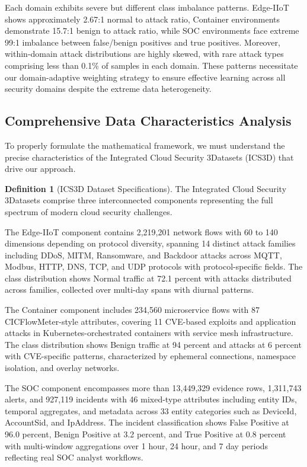 \documentclass[12pt,a4paper]{article}
\theoremstyle{definition}
\newtheorem{definition}[theorem]{Definition}
\begin{document}
Each domain exhibits severe but different class imbalance patterns. Edge-IIoT shows approximately 2.67:1 normal to attack ratio, Container environments demonstrate 15.7:1 benign to attack ratio, while SOC environments face extreme 99:1 imbalance between false/benign positives and true positives. Moreover, within-domain attack distributions are highly skewed, with rare attack types comprising less than 0.1\% of samples in each domain. These patterns necessitate our domain-adaptive weighting strategy to ensure effective learning across all security domains despite the extreme data heterogeneity.

\subsection{Comprehensive Data Characteristics Analysis}

To properly formulate the mathematical framework, we must understand the precise characteristics of the Integrated Cloud Security 3Datasets (ICS3D) that drive our approach.

\begin{definition}[ICS3D Dataset Specifications]
\label{def:ics3d_specs}
The Integrated Cloud Security 3Datasets comprise three interconnected components representing the full spectrum of modern cloud security challenges.

The Edge-IIoT component contains 2,219,201 network flows with 60 to 140 dimensions depending on protocol diversity, spanning 14 distinct attack families including DDoS, MITM, Ransomware, and Backdoor attacks across MQTT, Modbus, HTTP, DNS, TCP, and UDP protocols with protocol-specific fields. The class distribution shows Normal traffic at 72.1 percent with attacks distributed across families, collected over multi-day spans with diurnal patterns.

The Container component includes 234,560 microservice flows with 87 CICFlowMeter-style attributes, covering 11 CVE-based exploits and application attacks in Kubernetes-orchestrated containers with service mesh infrastructure. The class distribution shows Benign traffic at 94 percent and attacks at 6 percent with CVE-specific patterns, characterized by ephemeral connections, namespace isolation, and overlay networks.

The SOC component encompasses more than 13,449,329 evidence rows, 1,311,743 alerts, and 927,119 incidents with 46 mixed-type attributes including entity IDs, temporal aggregates, and metadata across 33 entity categories such as DeviceId, AccountSid, and IpAddress. The incident classification shows False Positive at 96.0 percent, Benign Positive at 3.2 percent, and True Positive at 0.8 percent with multi-window aggregations over 1 hour, 24 hour, and 7 day periods reflecting real SOC analyst workflows.
\end{definition}
\end{document}
